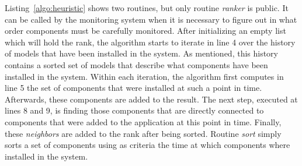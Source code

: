 Listing~\ref{algo:heuristic} shows two routines, but only routine \textit{ranker} is public.
It can be called by the monitoring system when it is necessary to figure out in what order components must be carefully monitored. 
After initializing an empty list which will hold the rank, the algorithm starts to iterate in line 4 over the history of models that have been installed in the system.
As mentioned, this history contains a sorted set of models that describe what components have been installed in the system.
Within each iteration, the algorithm first computes in line 5 the set of components that were installed at such a point in time.
Afterwards, these components are added to the result.
The next step, executed at lines 8 and 9, is finding those components that are directly connected to components that were added to the application at this point in time.
Finally, these \textit{neighbors} are added to the rank after being sorted.
Routine \textit{sort} simply sorts a set of components using as criteria the time at which components where installed in the system.

%
